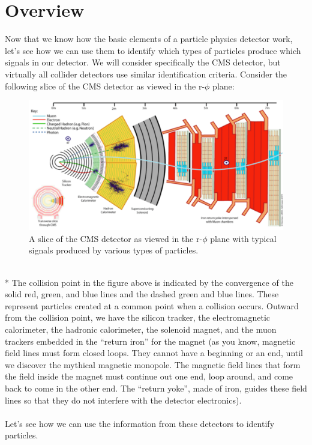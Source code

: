 \section{Overview}
Now that we know how the basic elements of a particle physics detector work, let's see how we can use them to identify which types of particles produce which signals in our detector.  We will consider specifically the CMS detector, but virtually all collider detectors use similar identification criteria.
\newpage \noindent
Consider the following slice of the CMS detector as viewed in the r-$\phi$ plane: 
\begin{figure}[h]
\centering\includegraphics[scale=0.6]{./particleID/Pictures/fig1.pdf}
\caption{A slice of the CMS detector as viewed in the r-$\phi$ plane with typical signals produced by various types of particles. }
\label{fig:pdgdedx}
\end{figure} 
\\*
The collision point in the figure above is indicated by the convergence of the solid red, green, and blue lines and the dashed green and blue lines.  These represent particles created at a common point when a collision occurs.  Outward from the collision point, we have the silicon tracker, the electromagnetic calorimeter, the hadronic calorimeter, the solenoid magnet, and the muon trackers embedded in the ``return iron'' for the magnet (as you know, magnetic field lines must form closed loops. They cannot have a beginning or an end, until we discover the mythical magnetic monopole. The magnetic field lines that form the field inside the magnet must continue out one end, loop around, and come back to come in the other end. The ``return yoke'', made of iron, guides these field lines so that they do not interfere with the detector electronics).  
\\
\\
\noindent
Let's see how we can use the information from these detectors to identify particles.
